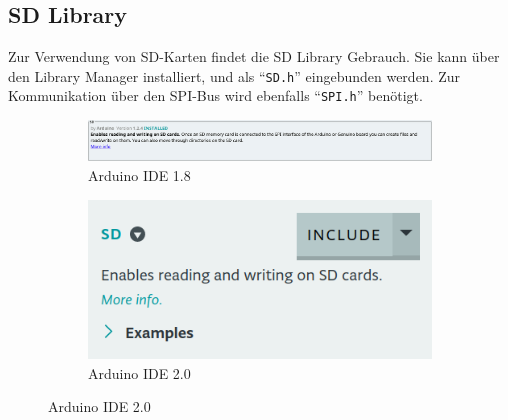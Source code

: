 \documentclass[ngerman]{schoolPres}
\begin{document}
  \subsection{SD Library}%
  \begin{frame}
    Zur Verwendung von SD-Karten findet die SD Library Gebrauch.
    Sie kann über den Library Manager installiert, und als \enquote{\texttt{SD.h}} eingebunden werden.
    Zur Kommunikation über den SPI-Bus wird ebenfalls \enquote{\texttt{SPI.h}} benötigt.


    \vfill
    \begin{figure}[!ht]
      \centering
      \begin{subfigure}{.75\linewidth}
        \includegraphics[width=\linewidth]{media/sd-lib.png}
        \caption{Arduino IDE 1.8}
      \end{subfigure}\hspace{1.5em}
      \begin{subfigure}{.2\linewidth}
        \includegraphics[width=\linewidth]{media/sd-lib-web.png}
        \caption{Arduino IDE 2.0}
      \end{subfigure}
    \end{figure}
    \begin{center}
    \end{center}
  \end{frame}
\end{document}
